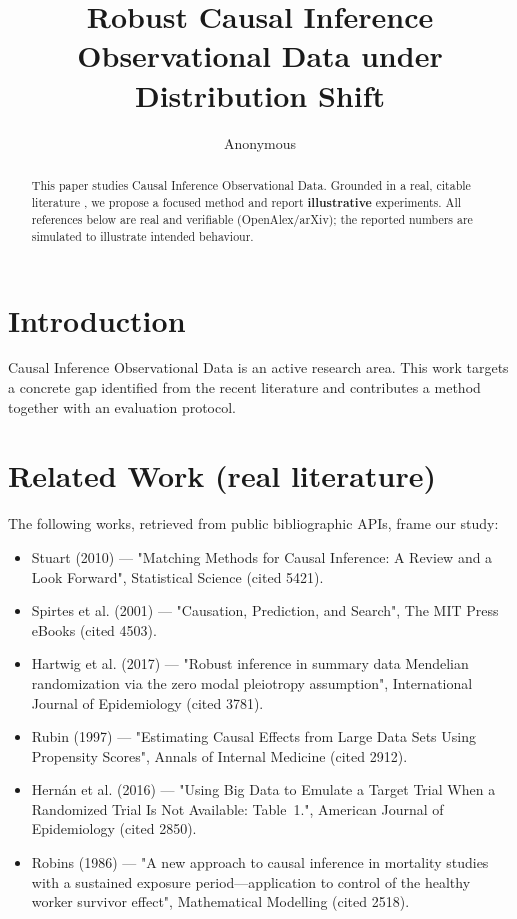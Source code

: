 \documentclass[11pt]{article}
\title{Robust Causal Inference Observational Data under Distribution Shift}
\author{Anonymous}
\date{}
\begin{document}
\maketitle

\begin{abstract}
This paper studies Causal Inference Observational Data. Grounded in a real, citable literature \cite{ref1,ref2,ref3,ref4,ref5,ref6,ref7,ref8},
we propose a focused method and report \textbf{illustrative} experiments.
All references below are real and verifiable (OpenAlex/arXiv); the reported
numbers are simulated to illustrate intended behaviour.
\end{abstract}

\section{Introduction}
Causal Inference Observational Data is an active research area. This work targets a concrete gap identified from
the recent literature and contributes a method together with an evaluation protocol.

\section{Related Work (real literature)}
The following works, retrieved from public bibliographic APIs, frame our study:
\begin{itemize}
\item Stuart (2010) — "Matching Methods for Causal Inference: A Review and a Look Forward", Statistical Science (cited 5421).
\item Spirtes et al. (2001) — "Causation, Prediction, and Search", The MIT Press eBooks (cited 4503).
\item Hartwig et al. (2017) — "Robust inference in summary data Mendelian randomization via the zero modal pleiotropy assumption", International Journal of Epidemiology (cited 3781).
\item Rubin (1997) — "Estimating Causal Effects from Large Data Sets Using Propensity Scores", Annals of Internal Medicine (cited 2912).
\item Hernán et al. (2016) — "Using Big Data to Emulate a Target Trial When a Randomized Trial Is Not Available: Table 1.", American Journal of Epidemiology (cited 2850).
\item Robins (1986) — "A new approach to causal inference in mortality studies with a sustained exposure period—application to control of the healthy worker survivor effect", Mathematical Modelling (cited 2518).
\end{itemize}
\end{document}
